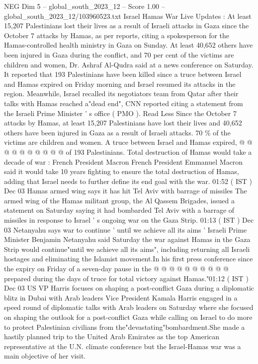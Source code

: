 \begin{textsample}{NEG Dim 5 – global\_south\_2023\_12 – Score 1.00 – global\_south\_2023\_12/103960523.txt}  \label{ex:f5_neg_239}
Israel Hamas War Live Updates : At least 15,207 Palestinians lost their lives as a result of Israeli attacks in Gaza since the October 7 attacks by Hamas, as per reports, citing a spokesperson for the Hamas-controlled health ministry in Gaza on Sunday.
At least 40,652 others have been injured in Gaza during the conflict, and 70 per cent of the victims are children and women, Dr.
Ashraf Al-Qudra said at a news conference on Saturday.
It reported that 193 Palestinians have been killed since a truce between Israel and Hamas expired on Friday morning and Israel resumed its attacks in the region.
Meanwhile, Israel recalled its negotiators team from Qatar after their talks with Hamas reached a"dead end", CNN reported citing a statement from the Israeli Prime Minister ' s office ( PMO ).
Read Less Since the October 7 attacks by Hamas, at least 15,207 Palestinians have lost their lives and 40,652 others have been injured in Gaza as a result of Israeli attacks. 70 \% of the victims are children and women.
A truce between Israel and Hamas expired, @ @ @ @ @ @ @ @ @ @ of 193 Palestinians.
Total destruction of Hamas would take a decade of war : French President Macron French President Emmanuel Macron said it would take 10 years fighting to ensure the total destruction of Hamas, adding that Israel needs to further define its end goal with the war. 01:52 ( IST ) Dec 03 Hamas armed wing says it has hit Tel Aviv with barrage of missiles The armed wing of the Hamas militant group, the Al Qassem Brigades, issued a statement on Saturday saying it had bombarded Tel Aviv with a barrage of missiles in response to Israel ' s ongoing war on the Gaza Strip. 01:13 ( IST ) Dec 03 Netanyahu says war to continue ' until we achieve all its aims ' Israeli Prime Minister Benjamin Netanyahu said Saturday the war against Hamas in the Gaza Strip would continue"until we achieve all its aims", including returning all Israeli hostages and eliminating the Islamist movement.In his first press conference since the expiry on Friday of a seven-day pause in the @ @ @ @ @ @ @ @ @ @ prepared during the days of truce for total victory against Hamas."01:12 ( IST ) Dec 03 US VP Harris focuses on shaping a post-conflict Gaza during a diplomatic blitz in Dubai with Arab leaders Vice President Kamala Harris engaged in a speed round of diplomatic talks with Arab leaders on Saturday where she focused on shaping the outlook for a post-conflict Gaza while calling on Israel to do more to protect Palestinian civilians from the"devastating"bombardment.She made a hastily planned trip to the United Arab Emirates as the top American representative at the U.N. climate conference but the Israel-Hamas war was a main objective of her visit.

\end{textsample}
